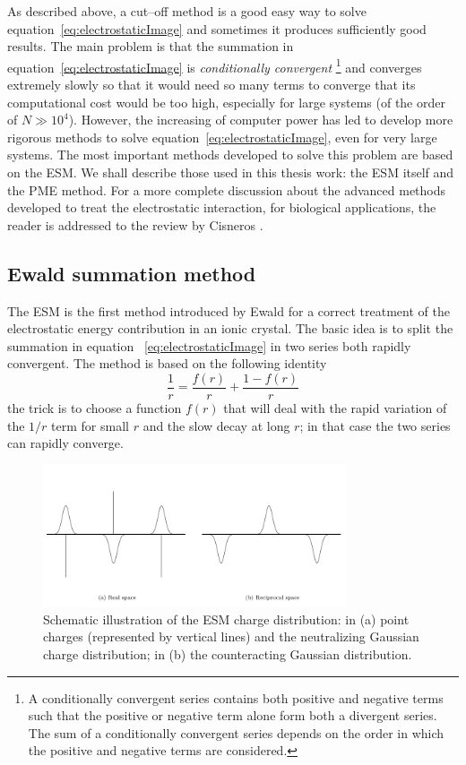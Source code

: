 As described above, a cut--off method is a good easy way to solve equation~\eqref{eq:electrostaticImage} and 
sometimes it produces sufficiently good results. The main problem is that the summation in 
equation~\eqref{eq:electrostaticImage} is \textit{conditionally convergent}
\footnote{A conditionally convergent series contains both positive and negative terms such that the positive or 
negative term alone form both a divergent series. The sum of a conditionally convergent series depends on the 
order in which the positive and negative terms are considered.} 
and converges extremely slowly so that it would need so many terms to converge that its computational cost would 
be too high, especially for large systems (of the order of $N \gg 10^4$). However, the increasing of computer 
power has led to develop more rigorous methods to solve equation~\eqref{eq:electrostaticImage}, even for very 
large systems. The most important methods developed to solve this problem are based on the \ac{ESM}. We shall 
describe those used in this thesis work: the \ac{ESM} itself and the \ac{PME} method. For a more complete 
discussion about the advanced methods developed to treat the electrostatic interaction, for biological 
applications, the reader is addressed to the review by Cisneros \etal{} \cite{Cisneros}.

\subsection{Ewald summation method} %
The \acf{ESM} is the first method introduced by Ewald for a correct treatment of the electrostatic energy
contribution in an ionic crystal. The basic idea is to split the summation in equation~
\eqref{eq:electrostaticImage} in two series both rapidly convergent. The method is based on the following 
identity
\begin{equation}
	\frac{1}{r} = \frac{f(r)}{r} + \frac{1 - f(r)}{r}
	\label{eq:ewaldTrick}
\end{equation}
the trick is to choose a function $f(r)$ that will deal with the rapid variation of the $1/r$ term for small $r$
and the slow decay at long $r$; in that case the two series can rapidly converge.
\begin{figure}[!ht]
	\centering
	\includegraphics[width=0.8\textwidth]{./img/EwaldSum/EwaldSum}
	\caption{Schematic illustration of the \acs{ESM} charge distribution: in (a) point charges (represented by vertical lines) and the neutralizing Gaussian charge distribution; in (b) the counteracting Gaussian distribution.}%
	\label{fig:ewald}
\end{figure}

